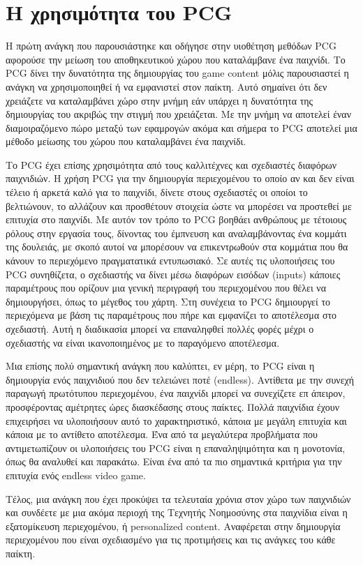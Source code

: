 \section{Η χρησιμότητα του PCG}
	Η πρώτη ανάγκη που παρουσιάστηκε και οδήγησε στην υιοθέτηση μεθόδων PCG αφορούσε την μείωση του αποθηκευτικού χώρου που καταλάμβανε ένα παιχνίδι. Το PCG δίνει την δυνατότητα της δημιουργίας του game content μόλις παρουσιαστεί η ανάγκη να χρησιμοποιηθεί ή να εμφανιστεί στον παίκτη. Αυτό σημαίνει ότι δεν χρειάζετε να καταλαμβάνει χώρο στην μνήμη εάν υπάρχει η δυνατότητα της δημιουργίας του ακριβώς την στιγμή που χρειάζεται. Με την μνήμη να αποτελεί έναν διαμοιραζόμενο πώρο μεταξύ των εφαμρογών ακόμα και σήμερα το PCG αποτελεί μια μέθοδο μείωσης του χώρου που καταλαμβάνει ένα παιχνίδι.
\par
	Το PCG έχει επίσης χρησιμότητα από τους καλλιτέχνες και σχεδιαστές διαφόρων παιχνιδιών. Η χρήση PCG για την δημιουργία περιεχομένου το οποίο αν και δεν είναι τέλειο ή αρκετά καλό για το παιχνίδι, δίνετε στους σχεδιαστές οι οποίοι το βελτιώνουν, το αλλάζουν και προσθέτουν στοιχεία ώστε να μπορέσει να προστεθεί με επιτυχία στο παιχνίδι. Με αυτόν τον τρόπο το PCG βοηθάει ανθρώπους με τέτοιους ρόλους στην εργασία τους, δίνοντας του έμπνευση και αναλαμβάνοντας ένα κομμάτι της δουλειάς, με σκοπό αυτοί να μπορέσουν να επικεντρωθούν στα κομμάτια που θα κάνουν το περιεχόμενο πραγματατικά εντυπωσιακό. Σε αυτές τις υλοποιήσεις του PCG συνηθίζετα, ο σχεδιαστής να δίνει μέσω διαφόρων εισόδων (inputs) κάποιες παραμέτρους που ορίζουν μια γενική περιγραφή του περιεχομένου που θέλει να δημιουργήσει, όπως το μέγεθος του χάρτη. Στη συνέχεια το PCG δημιουργεί το περιεχόμενα με βάση τις παραμέτρους που πήρε και εμφανίζει το αποτέλεσμα στο σχεδιαστή. Αυτή η διαδικασία μπορεί να επαναληφθεί πολλές φορές μέχρι ο σχεδιαστής να είναι ικανοποιημένος με το παραγόμενο αποτέλεσμα.  \cite{pcgieee}
\par
	Μια επίσης πολύ σημαντική ανάγκη που καλύπτει, εν μέρη, το PCG είναι η δημιουργία ενός παιχνιδιού που δεν τελειώνει ποτέ (endless). Αντίθετα με την συνεχή παραγωγή πρωτότυπου περιεχομένου, ένα παιχνίδι μπορεί να συνεχίζετε επ άπειρον, προσφέροντας αμέτρητες ώρες διασκέδασης στους παίκτες. Πολλά παιχνίδια έχουν επιχειρήσει να υλοποιήσουν αυτό το χαρακτηριστικό, κάποια με μεγάλη επιτυχία και κάποια με το αντίθετο αποτέλεσμα. Ένα από τα μεγαλύτερα προβλήματα που αντιμετωπίζουν οι υλοποιήσεις του PCG είναι η επαναληψιμότητα και η μονοτονία, όπως θα αναλυθεί και παρακάτω. Είναι ένα από τα πιο σημαντικά κριτήρια για την επιτυχία ενός endless video game.
\par
	Τέλος, μια ανάγκη που έχει προκύψει τα τελευταία χρόνια στον χώρο των παιχνιδιών και συνδέετε με μια ακόμα περιοχή της Τεχνητής Νοημοσύνης στα παιχνίδια είναι η εξατομίκευση περιεχομένου, ή personalized content. Αναφέρεται στην δημιουργία περιεχομένου που είναι σχεδιασμένο για τις προτιμήσεις και τις ανάγκες του κάθε παίκτη.

